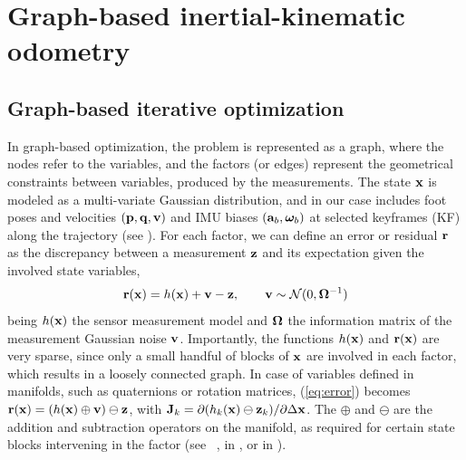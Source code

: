 
\section{Graph-based inertial-kinematic odometry}


\subsection{Graph-based iterative optimization}

In graph-based optimization, the problem is represented as a graph, where the nodes refer to the variables, and the factors (or edges) represent the geometrical constraints between variables, produced by the measurements.
%
The state ${\bf x}$ is modeled as a multi-variate Gaussian distribution, and in our case includes foot poses and velocities $({\bf p},{\bf q},{\bf v})$ and IMU biases $({\bf a}_b,{{\bm \omega}}_b)$ at selected keyframes (KF) along the trajectory (see ).
%
For each factor, we can define an error or residual ${\bf r}$ as the discrepancy between a measurement ${\bf z}$ and its expectation given the involved state variables,
%
\begin{equation}
    {\bf r}({\bf x}) = h({\bf x}) + {\bf v} - {\bf z}, \qquad {\bf v} \sim \mathcal {\mathcal{N}} (0, {\bm \Omega}^{-1})\label{eq:error}
\end{equation}
%
being $h({\bf x})$ the sensor measurement model and ${\bm \Omega}$ the information matrix of the measurement Gaussian noise ${\bf v}$.
Importantly, the functions $h({\bf x})$ and ${\bf r}({\bf x})$ are very sparse, since only a small handful of blocks of ${\bf x}$ are involved in each factor, which results in a loosely connected graph.
In case of variables defined in manifolds, such as quaternions or rotation matrices, (\ref{eq:error}) becomes ${\bf r}({\bf x}) = (h({\bf x}) \oplus {\bf v}) \ominus {\bf z}$, with ${\bf J}_k = \partial (h_k({\bf x})\ominus{\bf z}_k)/\partial \Delta {\bf x}$. 
The $\oplus$ and $\ominus$ are the addition and subtraction operators on the manifold, as required for certain state blocks intervening in the factor (see \eg~\cite{Smith_arv90},  in , or  in ).

